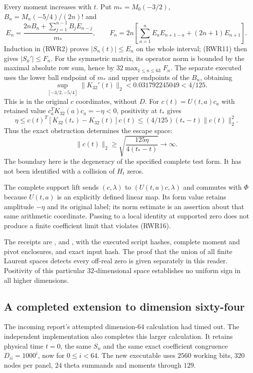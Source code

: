 Every moment increases with $t$. Put $m_*=M_0(-3/2)$,
$B_n=M_n(-5/4)/(2n)!$ and
\begin{equation}\tag{RWR14}
 E_n=\frac{2nB_n+\sum_{j=1}^{n-1}B_jE_{n-j}}{m_*},\qquad
 F_n=2n\left[\sum_{a=1}^n E_aE_{n+1-a}+(2n+1)E_{n+1}\right].
\end{equation}
Induction in (RWR2) proves $|S_n(t)|\le E_n$ on the whole interval;
(RWR11) then gives $|S_n'|\le F_n$. For the symmetric matrix, its
operator norm is bounded by the maximal absolute row sum, hence by
$32\max_{1\le n\le63}F_n$. The separate executed
 uses the lower ball endpoint of
$m_*$ and upper endpoints of the $B_n$, obtaining
\begin{equation}\tag{RWR15}
 \sup_{[-3/2,-5/4]}\|K_{32}'(t)\|_2
 <0.031792245049<4/125.
\end{equation}
This is in the original $c$ coordinates, without $D$.
For $c(t)=U(t,a)c_a$ with retained value
$c_a^TK_{32}(a)c_a=-\eta<0$, positivity at $t_*$ gives
\[
 \eta\le c(t)^T[K_{32}(t_*)-K_{32}(t)]c(t)
 \le(4/125)(t_*-t)\|c(t)\|_2^2.
\]
Thus the exact obstruction determines the escape space:
\begin{equation}\tag{RWR16}
 \|c(t)\|_2\ge\sqrt{\frac{125\eta}{4(t_*-t)}}\longrightarrow\infty.
\end{equation}
The boundary here is the degeneracy of the specified complete test
form. It has not been identified with a collision of $H_t$ zeros.

The complete support lift sends $(c,\lambda)$ to $(U(t,a)c,\lambda)$
and commutes with $\Phi$ because $U(t,a)$ is an explicitly defined
linear map. Its form value retains amplitude $-\eta$ and its original
label; its norm estimate is an assertion about that same arithmetic
coordinate. Passing to a local identity at supported zero does not
produce a finite coefficient limit that violates (RWR16).

The receipts are ,
 and
, with the executed
script hashes, complete moment and pivot enclosures, and exact input hash.
The proof that the union of all finite Laurent spaces detects every
off-real zero is given separately in this reader. Positivity of this
particular $32$-dimensional space establishes no uniform sign in all
higher dimensions.

\subsection{A completed extension to dimension sixty-four}
The incoming report's attempted dimension-$64$ calculation had timed out.
The independent implementation also completes this larger calculation.
It retains physical time $t=0$, the same $S_n$ and the same exact
coefficient congruence $D_{ii}=1000^i$, now for $0\le i<64$.
The new executable  uses $2560$
working bits, $320$ nodes per panel, $24$ theta summands and moments
through $129$.

